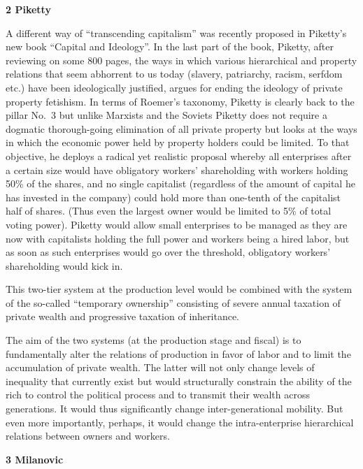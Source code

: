 \documentclass[
]{book}
\begin{document}
\textbf{2 Piketty}

A different way of ``transcending capitalism'' was recently proposed in Piketty's new book ``Capital and Ideology''. In the last part of the book, Piketty, after reviewing on some 800 pages, the ways in which various hierarchical and property relations that seem abhorrent to us today (slavery, patriarchy, racism, serfdom etc.) have been ideologically justified, argues for ending the ideology of private property fetishism. In terms of Roemer's taxonomy, Piketty is clearly back to the pillar No.~3 but unlike Marxists and the Soviets Piketty does not require a dogmatic thorough-going elimination of all private property but looks at the ways in which the economic power held by property holders could be limited. To that objective, he deploys a radical yet realistic proposal whereby all enterprises after a certain size would have obligatory workers' shareholding with workers holding 50\% of the shares, and no single capitalist (regardless of the amount of capital he has invested in the company) could hold more than one-tenth of the capitalist half of shares. (Thus even the largest owner would be limited to 5\% of total voting power). Piketty would allow small enterprises to be managed as they are now with capitalists holding the full power and workers being a hired labor, but as soon as such enterprises would go over the threshold, obligatory workers' shareholding would kick in.

This two-tier system at the production level would be combined with the system of the so-called ``temporary ownership'' consisting of severe annual taxation of private wealth and progressive taxation of inheritance.

The aim of the two systems (at the production stage and fiscal) is to fundamentally alter the relations of production in favor of labor and to limit the accumulation of private wealth. The latter will not only change levels of inequality that currently exist but would structurally constrain the ability of the rich to control the political process and to transmit their wealth across generations. It would thus significantly change inter-generational mobility. But even more importantly, perhaps, it would change the intra-enterprise hierarchical relations between owners and workers.

\textbf{3 Milanovic}
\end{document}
